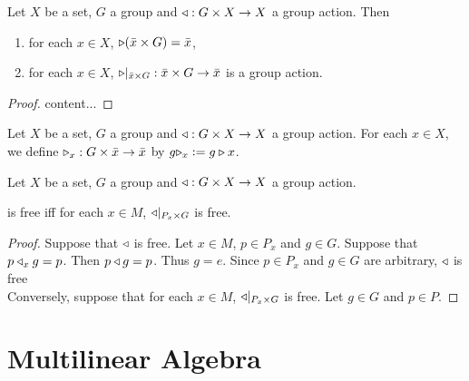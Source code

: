 \documentclass{book}
\begin{document}
\begin{ex}
	Let $X$ be a set, $G$ a group and $\triangleleft:G\times X \rightarrow X$ a group action. Then 
	\begin{enumerate}
		\item for each $x \in X$, $\triangleright(\bar{x} \times G) = \bar{x}$,
		\item for each $x \in X$, $\triangleright|_{\bar{x} \times G}: \bar{x} \times G \rightarrow \bar{x}$ is a group action.
	\end{enumerate}
\end{ex}

\begin{proof}
	content...
\end{proof}

\begin{defn}
	Let $X$ be a set, $G$ a group and $\triangleleft:G\times X \rightarrow X$ a group action. For each $x \in X$, we define  $\triangleright_x: G \times \bar{x} \rightarrow \bar{x}$ by $g \triangleright_x \vcentcolon= g \triangleright x$.
\end{defn}
\begin{ex}
	Let $X$ be a set, $G$ a group and $\triangleleft:G\times X \rightarrow X$ a group action.  
	
	is free iff for each $x \in M$, $\triangleleft|_{P_x \times G}$ is free. 
\end{ex}

\begin{proof}
	Suppose that $\triangleleft$ is free. Let $x \in M$, $p \in P_x$ and $g \in G$. Suppose that $p \triangleleft_x g = p$. Then $p \triangleleft g = p$. Thus $g = e$. Since $p \in P_x$ and $g \in G$ are arbitrary, $\triangleleft$ is free\\
	
	Conversely, suppose that for each $x \in M$, $\triangleleft|_{P_x \times G}$ is free. Let $g \in G$ and $p \in P$.
\end{proof}

















\newpage
	\chapter{Multilinear Algebra}
	
\end{document}
